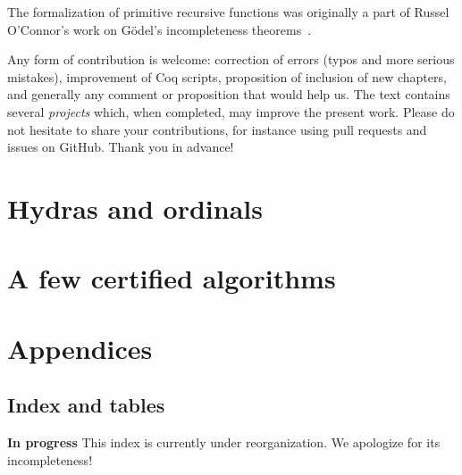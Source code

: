 \documentclass[twoside,a4paper]{book}
\begin{document}
The formalization of primitive recursive functions was originally a part of  Russel O'Connor's work on G\"odel's incompleteness theorems~\cite{OConnor05}. 

\label{sec:orgheadline2}

Any form of contribution  is welcome: correction of errors (typos and more serious mistakes), improvement of
Coq scripts, proposition of inclusion of new chapters, and generally any
comment or proposition that would help us. The text contains several \emph{projects} which, when completed, may improve the present work.
Please do not hesitate to share your contributions, for instance using pull requests and issues on GitHub. Thank you in advance!






\part{Hydras and ordinals}




\part{A few  certified algorithms}



\part{Appendices}








\chapter{Index and tables}

{\Large \textbf{In progress} This index is currently under reorganization.  We apologize for its incompleteness! }

\end{document}
